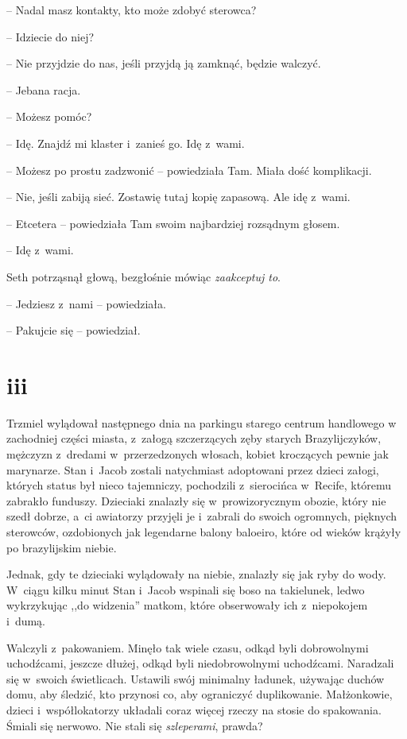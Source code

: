 \documentclass[oneside,polish,11pt,sfheadings]{mwbk}
\begin{document}
-- Nadal masz kontakty, kto może zdobyć sterowca?

-- Idziecie do niej?

-- Nie przyjdzie do nas, jeśli przyjdą ją zamknąć, będzie walczyć.

-- Jebana racja.

-- Możesz pomóc?

-- Idę. Znajdź mi klaster i~zanieś go. Idę z~wami.

-- Możesz po prostu zadzwonić -- powiedziała Tam. Miała dość komplikacji.

-- Nie, jeśli zabiją sieć. Zostawię tutaj kopię zapasową. Ale idę z~wami.

-- Etcetera -- powiedziała Tam swoim najbardziej rozsądnym głosem.

-- Idę z~wami.

Seth potrząsnął głową, bezgłośnie mówiąc \textit{zaakceptuj to}.

-- Jedziesz z~nami -- powiedziała.

-- Pakujcie się -- powiedział.

\chapter*{iii}
Trzmiel wylądował następnego dnia na parkingu starego centrum handlowego
w zachodniej części miasta, z~załogą szczerzących zęby starych
Brazylijczyków, mężczyzn z~dredami w~przerzedzonych włosach, kobiet
kroczących pewnie jak marynarze. Stan i~Jacob zostali natychmiast
adoptowani przez dzieci załogi, których status był nieco tajemniczy,
pochodzili z~sierocińca w~Recife, któremu zabrakło funduszy. Dzieciaki
znalazły się w~prowizorycznym obozie, który nie szedł dobrze, a~ci
awiatorzy przyjęli je i~zabrali do swoich ogromnych, pięknych sterowców,
ozdobionych jak legendarne balony baloeiro, które od wieków krążyły po
brazylijskim niebie.

Jednak, gdy te dzieciaki wylądowały na niebie, znalazły się jak ryby do
wody. W~ciągu kilku minut Stan i~Jacob wspinali się boso na takielunek,
ledwo wykrzykując ,,do widzenia'' matkom, które obserwowały ich z~niepokojem i~dumą.

Walczyli z~pakowaniem. Minęło tak wiele czasu, odkąd byli dobrowolnymi
uchodźcami, jeszcze dłużej, odkąd byli niedobrowolnymi uchodźcami.
Naradzali się w~swoich świetlicach. Ustawili swój minimalny ładunek,
używając duchów domu, aby śledzić, kto przynosi co, aby ograniczyć
duplikowanie. Małżonkowie, dzieci i~współlokatorzy układali coraz więcej
rzeczy na stosie do spakowania. Śmiali się nerwowo. Nie stali się
\textit{szleperami}, prawda?
\end{document}

